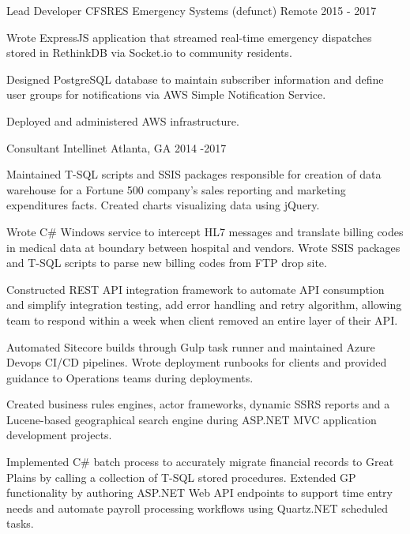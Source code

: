 \begin{cventries}
  \cventry
    {Lead Developer} %
    {CFSRES Emergency Systems (defunct)} %
    {Remote} %
    {2015 - 2017} %
    {
      \begin{cvitems} %
        \item {Wrote ExpressJS application that streamed real-time emergency dispatches stored in RethinkDB via Socket.io to community residents.}
        \item {Designed PostgreSQL database to maintain subscriber information and define user groups for notifications via AWS Simple Notification Service.}
        \item {Deployed and administered AWS infrastructure.}
      \end{cvitems}
    }

  \cventry
    {Consultant} %
    {Intellinet} %
    {Atlanta, GA} %
    {2014 -2017 } %
    {
      \begin{cvitems} %
        \item {Maintained T-SQL scripts and SSIS packages responsible for creation of data warehouse for a Fortune 500 company's sales reporting and marketing expenditures facts. Created charts visualizing data using jQuery.}
	\item {Wrote C\# Windows service to intercept HL7 messages and translate billing codes in medical data at boundary between hospital and vendors. Wrote SSIS packages and T-SQL scripts to parse new billing codes from FTP drop site.}
        \item {Constructed REST API integration framework to automate API consumption and simplify integration testing, add error handling and retry algorithm, allowing team to respond within a week when client removed an entire layer of their API.}
	\item {Automated Sitecore builds through Gulp task runner and maintained Azure Devops CI/CD pipelines. Wrote deployment runbooks for clients and provided guidance to Operations teams during deployments.}
	\item {Created business rules engines, actor frameworks, dynamic SSRS reports and a Lucene-based geographical search engine during ASP.NET MVC application development projects.}
	\item {Implemented C\# batch process to accurately migrate financial records to Great Plains by calling a collection of T-SQL stored procedures. Extended GP functionality by authoring ASP.NET Web API endpoints to support time entry needs and automate payroll processing workflows using Quartz.NET scheduled tasks.}
      \end{cvitems}
    }


\end{cventries}
